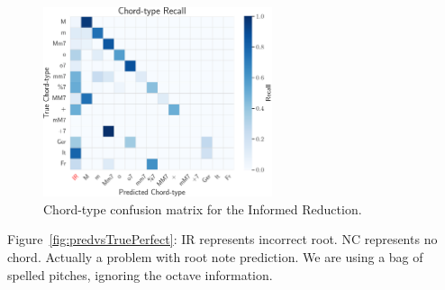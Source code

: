\documentclass[12pt,a4paper,twoside,openany]{report} \usepackage[pdfborder={0 0 0}]{hyperref}    %
\theoremstyle{definition} \newtheorem{definition}{Definition}[section]
\begin{document}
  \begin{figure}[H]
    \begin{center}
      \includegraphics[width=0.6\textwidth]{figs/eval/Harmony/perfectChordType.pdf}
    \end{center}
    \caption{Chord-type confusion matrix for the Informed Reduction.} 
    \label{fig:perfectConfusion}
  \end{figure}




  Figure~\ref{fig:predvsTruePerfect}: IR represents incorrect root. NC represents no chord. Actually a problem with root
  note prediction. We are using a bag of spelled pitches, ignoring the octave information.
\end{document}
